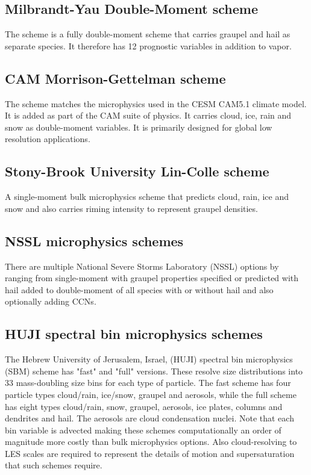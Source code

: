\subsection {Milbrandt-Yau Double-Moment scheme}
The \citet{milbrandt05} scheme is a fully double-moment scheme that carries graupel and hail as separate species.
It therefore has 12 prognostic variables in addition to vapor.

\subsection {CAM Morrison-Gettelman scheme}
The \citet{morrisongettelman08} scheme matches the microphysics used in the CESM CAM5.1 climate model. It is added as part of the CAM
suite of physics. It carries cloud, ice, rain and snow as double-moment variables. It is primarily designed for global low resolution applications.

\subsection {Stony-Brook University Lin-Colle scheme}
A single-moment bulk microphysics scheme \citep{lin11} that predicts cloud, rain, ice and snow and also carries riming intensity
to represent graupel densities.

\subsection {NSSL microphysics schemes}
There are multiple National Severe Storms Laboratory (NSSL) options by \citet{mansell10} ranging from single-moment with graupel
properties specified \citep{gilmore04} or predicted with hail added to double-moment of all species with or without hail and also optionally adding CCNs.

\subsection {HUJI spectral bin microphysics schemes}
The Hebrew University of Jerusalem, Israel, (HUJI) spectral bin microphysics (SBM) scheme has "fast" and "full" versions.
These resolve size distributions into 33 mass-doubling size bins for each type of particle. The fast scheme \citep{khain10} has four
particle types cloud/rain, ice/snow, graupel and aerosols, while the full scheme \citep{khain04} has eight types cloud/rain, snow, graupel, aerosols,
ice plates, columns and dendrites and hail. The aerosols are cloud condensation nuclei. Note that each bin variable is advected
making these schemes computationally an order of magnitude more costly than bulk microphysics options. Also cloud-resolving to LES
scales are required to represent the details of motion and supersaturation that such schemes require.

